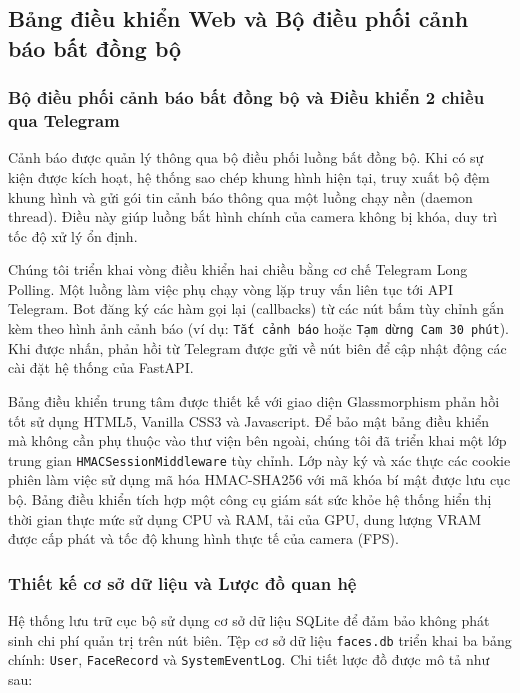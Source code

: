 \documentclass[12pt,a4paper]{article}
\begin{document}
\subsection{Bảng điều khiển Web và Bộ điều phối cảnh báo bất đồng bộ}

\subsubsection*{Bộ điều phối cảnh báo bất đồng bộ và Điều khiển 2 chiều qua Telegram}
Cảnh báo được quản lý thông qua bộ điều phối luồng bất đồng bộ. Khi có sự kiện được kích hoạt, hệ thống sao chép khung hình hiện tại, truy xuất bộ đệm khung hình và gửi gói tin cảnh báo thông qua một luồng chạy nền (daemon thread). Điều này giúp luồng bắt hình chính của camera không bị khóa, duy trì tốc độ xử lý ổn định.

Chúng tôi triển khai vòng điều khiển hai chiều bằng cơ chế Telegram Long Polling. Một luồng làm việc phụ chạy vòng lặp truy vấn liên tục tới API Telegram. Bot đăng ký các hàm gọi lại (callbacks) từ các nút bấm tùy chỉnh gắn kèm theo hình ảnh cảnh báo (ví dụ: \texttt{Tắt cảnh báo} hoặc \texttt{Tạm dừng Cam 30 phút}). Khi được nhấn, phản hồi từ Telegram được gửi về nút biên để cập nhật động các cài đặt hệ thống của FastAPI.

Bảng điều khiển trung tâm được thiết kế với giao diện Glassmorphism phản hồi tốt sử dụng HTML5, Vanilla CSS3 và Javascript.
Để bảo mật bảng điều khiển mà không cần phụ thuộc vào thư viện bên ngoài, chúng tôi đã triển khai một lớp trung gian \texttt{HMACSessionMiddleware} tùy chỉnh. Lớp này ký và xác thực các cookie phiên làm việc sử dụng mã hóa HMAC-SHA256 với mã khóa bí mật được lưu cục bộ. Bảng điều khiển tích hợp một công cụ giám sát sức khỏe hệ thống hiển thị thời gian thực mức sử dụng CPU và RAM, tải của GPU, dung lượng VRAM được cấp phát và tốc độ khung hình thực tế của camera (FPS).

\subsubsection*{Thiết kế cơ sở dữ liệu và Lược đồ quan hệ}
Hệ thống lưu trữ cục bộ sử dụng cơ sở dữ liệu SQLite để đảm bảo không phát sinh chi phí quản trị trên nút biên. Tệp cơ sở dữ liệu \texttt{faces.db} triển khai ba bảng chính: \texttt{User}, \texttt{FaceRecord} và \texttt{SystemEventLog}. Chi tiết lược đồ được mô tả như sau:
\end{document}
